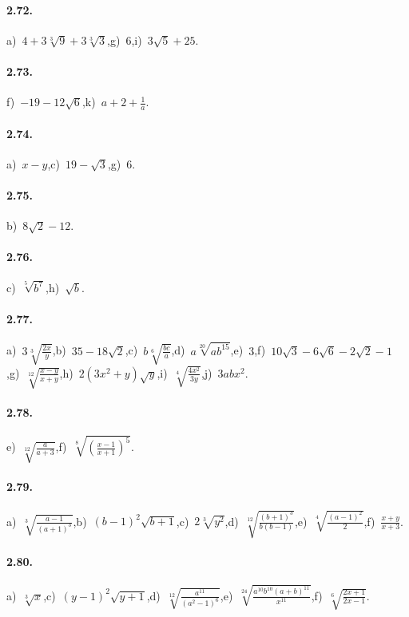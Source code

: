 \paragraph{2.72.}
a)~$4+3\sqrt[3]{9}+3\sqrt[3]{3}$,\quad g)~$6$,\quad i)~$3\sqrt 5+25$.

\paragraph{2.73.}
f)~$-19-12\sqrt 6$,\quad k)~$a+2+\frac 1 a$.

\paragraph{2.74.}
a)~$x-y$,\quad c)~$19-\sqrt{3}$,\quad g)~$6$.

\paragraph{2.75.}
b)~$8\sqrt{2}-12$.

\paragraph{2.76.}
c)~$\sqrt[5]{b^7}$,\quad h)~$\sqrt b$.

\paragraph{2.77.}
a)~$3\sqrt[3]{\frac{2x}{y}}$,\quad b)~$35-18\sqrt{2}$,\quad c)~$b\sqrt[6]{\frac{bc}{a}}$,\quad d)~$a\sqrt[20]{ab^{15}}$,\quad e)~$3$,\quad f)~$10\sqrt{3}-6\sqrt{6}-2\sqrt{2}-1$,\quad g)~$\sqrt[12]{\frac{x-y}{x+y}}$,\quad h)~$2(3x^2+y)\sqrt{y}$,\quad i)~$\sqrt[4]{\frac{4x^2}{3y}}$,\quad j)~$3abx^2$.

\paragraph{2.78.}
e)~$\sqrt[12]{\frac a{a+3}}$,\quad f)~$\sqrt[8]{\left(\frac{x-1}{x+1}\right)^5}$.

\paragraph{2.79.}
a)~$\sqrt[3]{\frac{a-1}{(a+1)^3}}$,\quad b)~$(b-1)^2\sqrt{b+1}$,\quad c)~$2\sqrt[3]{y^2}$,\quad d)~$\sqrt[12]{\frac{(b+1)^3}{b(b-1)}}$,\quad e)~$\sqrt[4]{\frac{(a-1)^2} 2}$,\quad f)~$\frac{x+y}{x+3}$.

\paragraph{2.80.}
a)~$\sqrt[3]x$,\quad c)~$(y-1)^2\sqrt{y+1}$,\quad d)~$\sqrt[12]{\frac{a^{11}}{(a^2-1)^6}}$,\quad e)~$\sqrt[24]{\frac{a^{10}b^{10}(a+b)^{11}}{x^{11}}}$,\quad f)~$\sqrt[6]{\frac{2x+1}{2x-1}}$.

